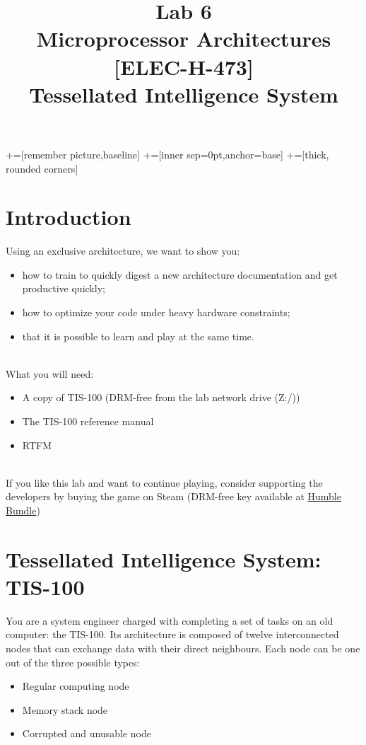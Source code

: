 \documentclass[10pt,a4paper]{article}
\date{\vspace{-1cm}\version}
\title{\vspace{-2cm} Lab 6\\ Microprocessor Architectures [ELEC-H-473]\\ Tessellated Intelligence System \ifthenelse{\boolean{corrige}}{~\\Corrigé}{}}
\theoremstyle{definition}%
\begin{document}
\newcommand\tabnode[1]{\addtocounter{nodecount}{1} \tikz \node (\arabic{nodecount}) {#1};}

+=[remember picture,baseline]
+=[inner sep=0pt,anchor=base]
+=[thick, rounded corners]



\maketitle
\section*{Introduction}

Using an exclusive architecture, we want to show you:
\begin{itemize}
\item how to train to quickly digest a new architecture documentation and get productive quickly;
\item how to optimize your code under heavy hardware constraints;
\item that it is possible to learn and play at the same time.
\end{itemize}
~\\

What you will need:
\begin{itemize}
\item A copy of TIS-100 (DRM-free from the lab network drive (Z:/))
\item The TIS-100 reference manual
\item RTFM
\end{itemize}
~\\
If you like this lab and want to continue playing, consider supporting the developers by buying the game on Steam (DRM-free key available at \href{https://www.humblebundle.com/store/tis100}{Humble Bundle})

\section{Tessellated Intelligence System: TIS-100}
You are a system engineer charged with completing a set of tasks on an old computer: the TIS-100.
Its architecture is composed of twelve interconnected nodes that can exchange data with their direct neighbours.
Each node can be one out of the three possible types: 
\begin{itemize}
	\item Regular computing node
	\item Memory stack node
	\item Corrupted and unusable node
\end{itemize}
\end{document}
